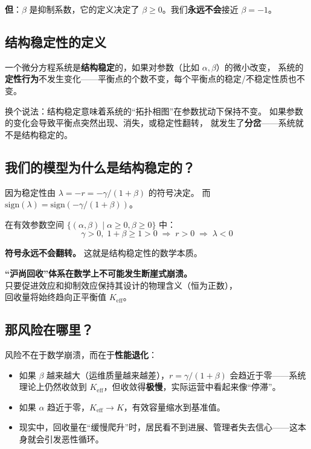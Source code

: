 \documentclass[12pt,a4paper]{article}
\begin{document}
\textbf{但}：$\beta$ 是抑制系数，它的定义决定了 $\beta \geq 0$。我们\textbf{永远不会}接近 $\beta = -1$。

\subsection{结构稳定性的定义}

\begin{theorybox}
一个微分方程系统是\textbf{结构稳定}的，如果对参数（比如 $\alpha, \beta$）的微小改变，
系统的\textbf{定性行为}不发生变化——平衡点的个数不变，每个平衡点的稳定/不稳定性质也不变。
\end{theorybox}

换个说法：结构稳定意味着系统的``拓扑相图''在参数扰动下保持不变。
如果参数的变化会导致平衡点突然出现、消失，或稳定性翻转，
就发生了\textbf{分岔}——系统就不是结构稳定的。

\subsection{我们的模型为什么是结构稳定的？}

因为稳定性由 $\lambda = -r = -\gamma/(1+\beta)$ 的符号决定。
而 $\text{sign}(\lambda) = \text{sign}(-\gamma/(1+\beta))$。

在有效参数空间 $\{(\alpha, \beta) \mid \alpha \geq 0, \beta \geq 0\}$ 中：
\[
\gamma > 0,\; 1+\beta \geq 1 > 0 \;\Rightarrow\; r > 0 \;\Rightarrow\; \lambda < 0
\]

\textbf{符号永远不会翻转。} 这就是结构稳定性的数学本质。

\begin{keypoint}[关键结论]
\begin{center}
\textbf{``沪尚回收''体系在数学上不可能发生断崖式崩溃。}\\[3pt]
只要促进效应和抑制效应保持其设计的物理含义（恒为正数），\\
回收量将始终趋向正平衡值 $K_{\text{eff}}$。
\end{center}
\end{keypoint}

\subsection*{那风险在哪里？}

风险不在于数学崩溃，而在于\textbf{性能退化}：

\begin{itemize}
  \item 如果 $\beta$ 越来越大（运维质量越来越差），$r = \gamma/(1+\beta)$ 会趋近于零——系统理论上仍然收敛到 $K_{\text{eff}}$，但收敛得\textbf{极慢}，实际运营中看起来像``停滞''。
  \item 如果 $\alpha$ 趋近于零，$K_{\text{eff}} \to K$，有效容量缩水到基准值。
  \item 现实中，回收量在``缓慢爬升''时，居民看不到进展、管理者失去信心——这本身就会引发恶性循环。
\end{itemize}
\end{document}
